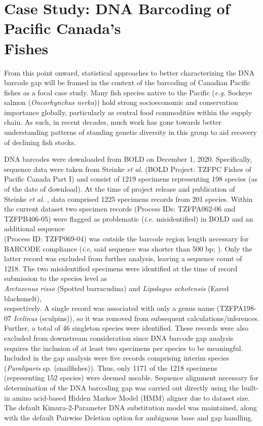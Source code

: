 \section{Case Study: DNA Barcoding of Pacific Canada's \\ Fishes}

From this point onward, statistical approaches to better characterizing the DNA barcode gap will be framed in the context of the barcoding of Canadian Pacific fishes as a focal case study. Many fish species native to the Pacific (\textit{e.g.} Sockeye salmon (\textit{Oncorhynchus nerka})) hold strong socioeconomic and conservation importance globally, particularly as central food commodities within the supply chain. As such, in recent decades, much work has gone towards better understanding patterns of standing genetic diversity in this group to aid recovery of declining fish stocks.   



DNA barcodes were downloaded from BOLD on December 1, 2020. Specifically, \\ sequence data were taken from Steinke \textit{et al.} \cite{steinke2009dna} (BOLD Project: TZFPC Fishes of Pacific Canada Part I) and consist of 1219 specimens representing 198 species (as of the date of download). At the time of project release and publication of Steinke \textit{et al.} \cite{steinke2009dna}, data comprised 1225 specimens records from 201 species. Within the current dataset two specimen records (Process IDs: TZFPA062-06 and TZFPB406-05) were flagged as problematic (\textit{i.e.} misidentified) in BOLD and an additional sequence \\ (Process ID: TZFP069-04) was outside the barcode region length necessary for BARCODE compliance (\textit{i.e}, said sequence was shorter than 500 bp; \cite{hanner2009data}). Only the latter record was excluded from further analysis, leaving a sequence count of 1218. The two misidentified specimens were identified at the time of record submission to the species level as \\ \textit{Arctozenus risso} (Spotted barracudina) and \textit{Lipolagus ochotensis} (Eared blacksmelt), \\ respectively. A single record was associated with only a genus name (TZFPA198-07 \textit{Icelinus} (sculpins)), so it was removed from subsequent calculations/inferences. Further, a total of 46 singleton species were identified. These records were also excluded from downstream consideration since DNA barcode gap analysis requires the inclusion of at least two specimens per species to be meaningful. Included in the gap analysis were five records comprising interim species (\textit{Paraliparis} sp. (snailfishes)). Thus, only 1171 of the 1218 specimens (representing 152 species) were deemed useable. Sequence alignment necessary for determination of the DNA barcoding gap was carried out directly using the built-in amino acid-based Hidden Markov Model (HMM) aligner due to dataset size. The default Kimura-2-Parameter DNA substitution model was maintained, along with the default Pairwise Deletion option for ambiguous base and gap handling. 



